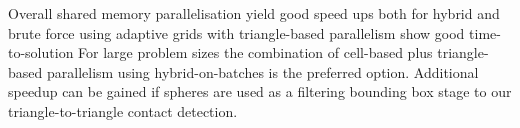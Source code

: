 Overall shared memory parallelisation yield good speed ups both for hybrid and brute force using adaptive grids with triangle-based parallelism show good time-to-solution For large problem sizes the combination of cell-based plus triangle-based parallelism using hybrid-on-batches is the preferred option. Additional speedup can be gained if spheres are used as a filtering bounding box stage to our triangle-to-triangle contact detection.

\clearpage


